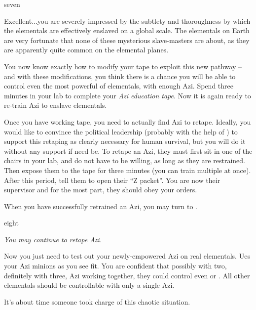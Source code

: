 \documentclass[notebook]{elementals}
\begin{document}
\begin{page}{seven}

Excellent...you are severely impressed by the subtlety and thoroughness by which the elementals are effectively enslaved on a global scale. The elementals on Earth are very fortunate that none of these mysterious slave-masters are about, as they are apparently quite common on the elemental planes.

You now know exactly how to modify your tape to exploit this new pathway -- and with these modifications, you think there is a chance you will be able to control even the most powerful of elementals, with enough Azi. Spend three minutes in your lab to complete your \emph{Azi education tape}. Now it is again ready to re-train Azi to enslave elementals.

Once you have working tape, you need to actually find Azi to retape. Ideally, you would like to convince the political leadership (probably with the help of \cDema{}) to support this retaping as clearly necessary for human survival, but you will do it without any support if need be. To retape an Azi, they must first sit in one of the chairs in your lab, and do not have to be willing, as long as they are restrained. Then expose them to the tape for three minutes (you can train multiple at once). After this period, tell them to open their ``Z packet''. You are now their supervisor and for the most part, they should obey your orders.

When you have successfully retrained an Azi, you may turn to .

\end{page}

\begin{page}{eight}

\emph{You may continue to retape Azi.}

Now you just need to test out your newly-empowered Azi on real elementals. Ues your Azi minions as you see fit. You are confident that possibly with two, definitely with three, Azi working together, they could control even \cQueen{} or \cKing{}. All other elementals should be controllable with only a single Azi.

It's about time someone took charge of this chaotic situation.

\end{page}

\endnotebook
\end{document}
